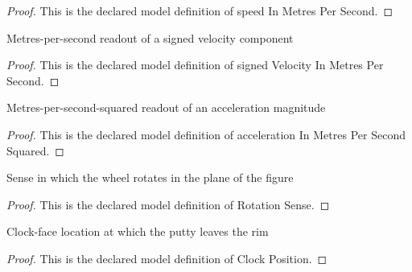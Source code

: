 \begin{proof}
  This is the declared model definition of speed In Metres Per Second.
\end{proof}
\begin{definition}
  \label{def:physics:phyx-mini-0753:phyxminiproblems-problemphyxmini0753-signedvelocityinmetrespersecond}
  Metres-per-second readout of a signed velocity component
\end{definition}
\begin{proof}
  This is the declared model definition of signed Velocity In Metres Per Second.
\end{proof}
\begin{definition}
  \label{def:physics:phyx-mini-0753:phyxminiproblems-problemphyxmini0753-accelerationinmetrespersecondsquared}
  Metres-per-second-squared readout of an acceleration magnitude
\end{definition}
\begin{proof}
  This is the declared model definition of acceleration In Metres Per Second Squared.
\end{proof}
\begin{definition}
  \label{def:physics:phyx-mini-0753:phyxminiproblems-problemphyxmini0753-rotationsense}
  Sense in which the wheel rotates in the plane of the figure
\end{definition}
\begin{proof}
  This is the declared model definition of Rotation Sense.
\end{proof}
\begin{definition}
  \label{def:physics:phyx-mini-0753:phyxminiproblems-problemphyxmini0753-clockposition}
  Clock-face location at which the putty leaves the rim
\end{definition}
\begin{proof}
  This is the declared model definition of Clock Position.
\end{proof}
